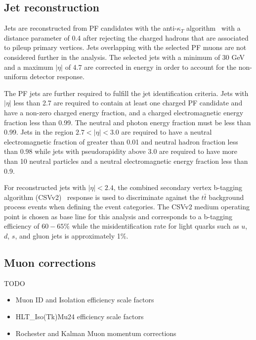 \subsection{Jet reconstruction}
Jets are reconstructed from PF candidates with the anti-$\kappa_{T}$
algorithm~\cite{Cacciari:2008gp} with a distance parameter of 0.4 after
rejecting the charged hadrons that are associated to pileup primary vertices.
Jets overlapping with the selected PF muons are not
considered further in the analysis. The selected jets with a minimum \pt
of 30 GeV and a maximum $|\eta|$ of 4.7 are corrected in energy in order to
account for the non-uniform detector response.

The PF jets are further required to fulfill the jet identification criteria.
Jets with $|\eta|$ less than 2.7 are required to contain at
least one charged PF candidate and have a non-zero charged energy fraction,
and a charged electromagnetic energy fraction less than 0.99. The
neutral and photon energy fraction must be less than 0.99. Jets in
the region $2.7<|\eta|<3.0$ are required to have a neutral electromagnetic
fraction of greater than 0.01 and neutral hadron fraction less than
0.98 while jets with pseudorapidity above 3.0 are required to have more
than 10 neutral particles and a neutral electromagnetic energy fraction
less than 0.9.

For reconstructed jets with $|\eta| < 2.4$, the combined secondary vertex b-tagging
algorithm (CSVv2)~\cite{Chatrchyan:2012jua} response is used to discriminate
against the $t\bar{t}$ background process events when defining the event
categories. The CSVv2 medium operating point is chosen as base line for this
analysis and corresponds to a b-tagging efficiency of $60-65\%$ while the
misidentification rate for light quarks such as $u$, $d$, $s$, and gluon jets
is approximately 1\%.

\subsection{Muon corrections}

TODO

\begin{itemize}
\item Muon ID and Isolation efficiency scale factors
\item HLT\_Iso(Tk)Mu24 efficiency scale factors
\item Rochester and Kalman Muon momentum corrections
\end{itemize}

